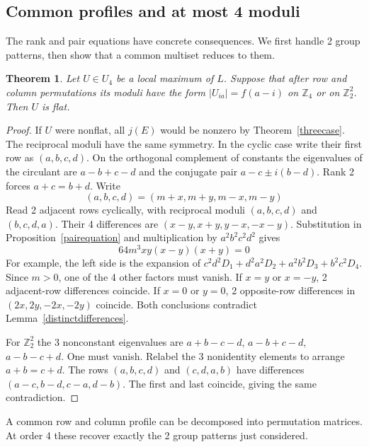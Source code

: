 \documentclass[11pt,a4paper]{article}
\newtheorem{thm}{Theorem}[section]
\begin{document}
\subsection{Common profiles and at most 4 moduli}\label{fewmoduli}
The rank and pair equations have concrete consequences. We first handle
2 group patterns, then show that a common multiset reduces to them.

\begin{thm}\label{groupmoduli}
Let $U\in U_4$ be a local maximum of $L$. Suppose that after row and
column permutations its moduli have the form $|U_{ia}|=f(a-i)$ on
$\mathbb Z_4$ or on $\mathbb Z_2^2$. Then $U$ is flat.
\end{thm}
\begin{proof}
If $U$ were nonflat, all $j(E)$ would be nonzero by
Theorem~\ref{threecase}. The reciprocal moduli have the same symmetry.
In the cyclic case write their first row as $(a,b,c,d)$.
On the orthogonal complement of constants the eigenvalues of the
circulant are $a-b+c-d$ and the conjugate pair
$a-c\pm i(b-d)$. Rank 2 forces $a+c=b+d$. Write
\[
 (a,b,c,d)=(m+x,m+y,m-x,m-y)
\]
Read 2 adjacent rows cyclically, with reciprocal moduli
$(a,b,c,d)$ and $(b,c,d,a)$. Their 4 differences are
$(x-y,x+y,y-x,-x-y)$. Substitution in
Proposition~\ref{pairequation} and multiplication by $a^2b^2c^2d^2$
gives
\[
 64m^3xy(x-y)(x+y)=0
\]
For example, the left side is the expansion of
$c^2d^2D_1+d^2a^2D_2+a^2b^2D_3+b^2c^2D_4$. Since $m>0$, one of the
4 other factors must vanish. If $x=y$ or $x=-y$, 2 adjacent-row
differences coincide. If $x=0$ or $y=0$, 2 opposite-row differences
in $(2x,2y,-2x,-2y)$ coincide. Both conclusions contradict
Lemma~\ref{distinctdifferences}.

For $\mathbb Z_2^2$ the 3 nonconstant eigenvalues are
$a+b-c-d$, $a-b+c-d$, $a-b-c+d$. One must vanish. Relabel the 3
nonidentity elements to arrange $a+b=c+d$. The rows $(a,b,c,d)$ and
$(c,d,a,b)$ have differences $(a-c,b-d,c-a,d-b)$. The first and
last coincide, giving the same contradiction.
\end{proof}

A common row and column profile can be decomposed into permutation
matrices. At order 4 these recover exactly the 2 group patterns
just considered.
\end{document}
